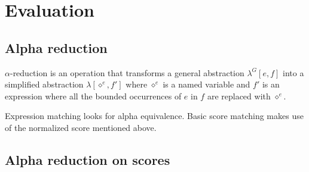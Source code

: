 \documentclass[10pt,a4paper,frenchb]{article}
\makeatletter
\newcommand{\var}[1]	{\ensuremath{\diamond^#1}}
\newcommand{\applyop}	{\ensuremath{@}}
\newcommand{\seq}			{:}
\makeatother
\begin{document}



\section{Evaluation}

\subsection{Alpha reduction}

$\alpha$-reduction is an operation that transforms a general abstraction $\lambda^G[e,f]$ into a simplified abstraction $\lambda[\var{e},f']$ where $\var{e}$ is a named variable and $f'$ is an expression where all the bounded occurrences of $e$ in $f$ are replaced with $\var{e}$.

Expression matching looks for alpha equivalence. Basic score matching makes use of the normalized score mentioned above. 

\subsection{Alpha reduction on scores}
\end{document}
